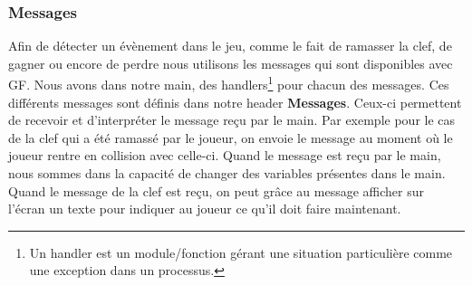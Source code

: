 \documentclass{article}
\begin{document}
\subsubsection{Messages}
Afin de détecter un évènement dans le jeu, comme le fait de ramasser la clef, de gagner ou encore de perdre nous utilisons les messages qui sont disponibles avec GF. Nous avons dans notre main, des handlers\footnote{Un handler est un module/fonction gérant une situation particulière comme une exception dans un processus.} pour chacun des messages. Ces différents messages sont définis dans notre header \textbf{Messages}. Ceux-ci permettent de recevoir et d'interpréter le message reçu par le main. Par exemple pour le cas de la clef qui a été ramassé par le joueur, on envoie le message au moment où le joueur rentre en collision avec celle-ci. Quand le message est reçu par le main, nous sommes dans la capacité de changer des variables présentes dans le main. Quand le message de la clef est reçu, on peut grâce au message afficher sur l'écran un texte pour indiquer au joueur ce qu'il doit faire maintenant.
\end{document}
